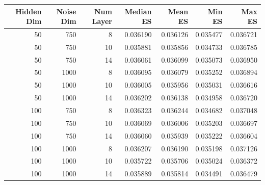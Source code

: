 \begin{tabular}{rrrrrrr}
\toprule
Hidden Dim & Noise Dim & Num Layer & Median ES & Mean ES & Min ES & Max ES \\
\midrule
50 & 750 & 8 & 0.036190 & 0.036126 & 0.035477 & 0.036721 \\
50 & 750 & 10 & 0.035881 & 0.035856 & 0.034733 & 0.036785 \\
50 & 750 & 14 & 0.036061 & 0.036099 & 0.035073 & 0.036950 \\
50 & 1000 & 8 & 0.036095 & 0.036079 & 0.035252 & 0.036894 \\
50 & 1000 & 10 & 0.036005 & 0.035956 & 0.035031 & 0.036616 \\
50 & 1000 & 14 & 0.036202 & 0.036138 & 0.034958 & 0.036720 \\
100 & 750 & 8 & 0.036323 & 0.036244 & 0.034682 & 0.037048 \\
100 & 750 & 10 & 0.036069 & 0.036006 & 0.035203 & 0.036697 \\
100 & 750 & 14 & 0.036060 & 0.035939 & 0.035222 & 0.036604 \\
100 & 1000 & 8 & 0.036207 & 0.036190 & 0.035198 & 0.037126 \\
100 & 1000 & 10 & 0.035722 & 0.035706 & 0.035024 & 0.036372 \\
100 & 1000 & 14 & 0.035889 & 0.035814 & 0.034491 & 0.036479 \\
\bottomrule
\end{tabular}
